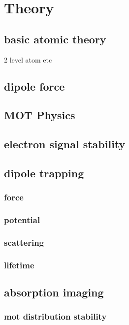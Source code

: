 \chapter{Theory}

\section{basic atomic theory}

2 level atom etc

\section{dipole force}

\section{MOT Physics}

\section{electron signal stability}

\section{dipole trapping}

    \subsection{force}

    \subsection{potential}

    \subsection{scattering}

    \subsection{lifetime}


\section{absorption imaging}

    \subsection{mot distribution stability}

